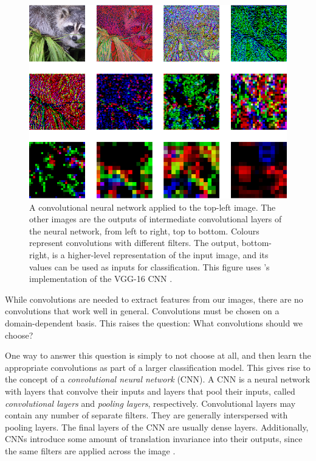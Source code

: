         \begin{figure}
            \centering
            \includegraphics[width=\textwidth]{images/face_cnn.png}
            \caption{A convolutional neural network applied to the top-left
                image. The other images are the outputs of intermediate
                convolutional layers of the neural network, from left to right,
                top to bottom. Colours represent convolutions with different
                filters. The output, bottom-right, is a higher-level
                representation of the input image, and its values can be used
                as inputs for classification. This figure uses
                \citeauthor{baraldi15}'s implementation of the VGG-16 CNN
                \citep{simoyan14}.}
            \label{fig:face-cnn}
        \end{figure}

        While convolutions are needed to extract features from our images, there
        are no convolutions that work well in general. Convolutions must be
        chosen on a domain-dependent basis. This raises the question: What
        convolutions should we choose?

        One way to answer this question is simply to not choose at all, and
        then learn the appropriate convolutions as part of a larger
        classification model. This gives rise to the concept of a
        \emph{convolutional neural network} (CNN). A CNN is a neural network
        with layers that convolve their inputs and layers that pool their
        inputs, called \emph{convolutional layers} and \emph{pooling layers},
        respectively. Convolutional layers may contain any number of separate
        filters. They are generally interspersed with pooling layers. The final
        layers of the CNN are usually dense layers. Additionally, CNNs introduce
        some amount of translation invariance into their outputs, since the same
        filters are applied across the image \citep{lecun98}.


